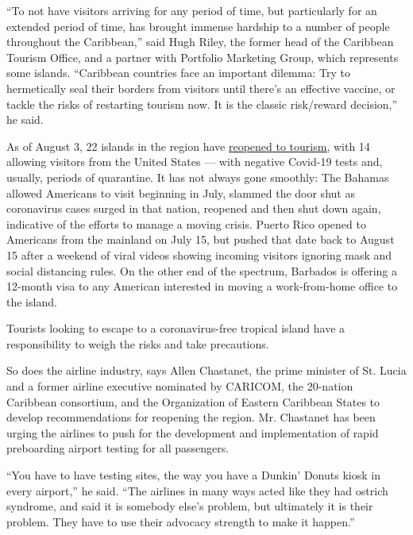 ``To not have visitors arriving for any period of time, but particularly
for an extended period of time, has brought immense hardship to a number
of people throughout the Caribbean,'' said Hugh Riley, the former head
of the Caribbean Tourism Office, and a partner with Portfolio Marketing
Group, which represents some islands. ``Caribbean countries face an
important dilemma: Try to hermetically seal their borders from visitors
until there's an effective vaccine, or tackle the risks of restarting
tourism now. It is the classic risk/reward decision,'' he said.

As of August 3, 22 islands in the region have
\href{https://docs.google.com/document/d/1ytW37gjS3WeVhN-k4ZK-N5fwgrksljMIEsd6ToGSOB8/edit}{reopened
to tourism,} with 14 allowing visitors from the United States --- with
negative Covid-19 tests and, usually, periods of quarantine. It has not
always gone smoothly: The Bahamas allowed Americans to visit beginning
in July, slammed the door shut as coronavirus cases surged in that
nation, reopened and then shut down again, indicative of the efforts to
manage a moving crisis. Puerto Rico opened to Americans from the
mainland on July 15, but pushed that date back to August 15 after a
weekend of viral videos showing incoming visitors ignoring mask and
social distancing rules. On the other end of the spectrum, Barbados is
offering a 12-month visa to any American interested in moving a
work-from-home office to the island.

Tourists looking to escape to a coronavirus-free tropical island have a
responsibility to weigh the risks and take precautions.

So does the airline industry, says Allen Chastanet, the prime minister
of St. Lucia and a former airline executive nominated by CARICOM, the
20-nation Caribbean consortium, and the Organization of Eastern
Caribbean States to develop recommendations for reopening the region.
Mr. Chastanet has been urging the airlines to push for the development
and implementation of rapid preboarding airport testing for all
passengers.

``You have to have testing sites, the way you have a Dunkin' Donuts
kiosk in every airport,'' he said. ``The airlines in many ways acted
like they had ostrich syndrome, and said it is somebody else's problem,
but ultimately it is their problem. They have to use their advocacy
strength to make it happen.''

